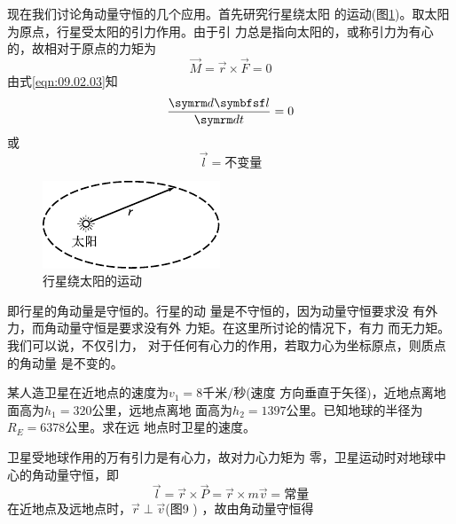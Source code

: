 现在我们讨论角动量守恒的几个应用。首先研究行星绕太阳
的运动(图\ref{fig:09.02})。取太阳为原点，行星受太阳的引力作用。由于引
力总是指向太阳的，或称引力为有心的，故相对于原点的力矩为
\begin{equation*}
  \vec{M} = \vec{r} \times \vec{F} = 0
\end{equation*}
由式\eqref{eqn:09.02.03}知
\begin{equation*}
  \frac { \dif \vec{l} } { \dif t } = 0
\end{equation*}
或
\begin{equation}\label{eqn:09.02.04}
  \vec{l} = \text{不变量}
\end{equation}
\begin{figure}
  \centering
  \includegraphics{figure/fig09.02}
  \caption{行星绕太阳的运动}
  \label{fig:09.02}
\end{figure}
即行星的角动量是守恒的。行星的动
量是不守恒的，因为动量守恒要求没
有外力，而角动量守恒是要求没有外
力矩。在这里所讨论的情况下，有力
而无力矩。我们可以说，不仅引力，
对于任何有心力的作用，若取力心为坐标原点，则质点的角动量
是不变的。

\example 某人造卫星在近地点的速度为$ v _ { 1 } = 8 \text{千米}/\text{秒}$(速度
方向垂直于矢径)，近地点离地面高为$ h _ { 1 } = 320 \text{公里} $，远地点离地
面高为$ h _ { 2 } = 1397 \text{公里} $。已知地球的半径为$ R _ { E } = 6378 \text{公里} $。求在远
地点时卫星的速度。

\solution 卫星受地球作用的万有引力是有心力，故对力心力矩为
零，卫星运动时对地球中心的角动量守恒，即
\begin{equation*}
  \vec{l} = \vec{r} \times \vec{P} = \vec{r} \times m \vec{v} =  \text{常量}
\end{equation*}
在近地点及远地点时，$ \vec{r} \perp \vec{v} $(图9 )  ，故由角动量守恒得

